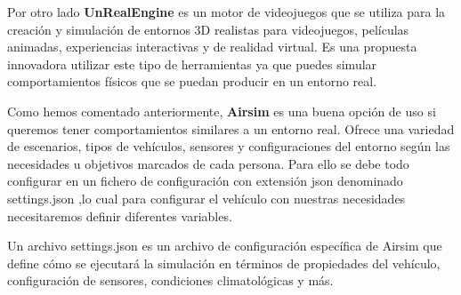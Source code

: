 Por otro lado \textbf{UnRealEngine} es un motor de videojuegos que se utiliza para la creación y simulación de entornos 3D realistas para videojuegos,
películas animadas, experiencias interactivas y de realidad virtual. Es una propuesta innovadora utilizar este tipo de herramientas ya que puedes simular 
comportamientos físicos que se puedan producir en un entorno real. \newline

Como hemos comentado anteriormente, \textbf{Airsim} es una buena opción de uso si queremos tener comportamientos
similares a un entorno real. Ofrece una variedad de escenarios, tipos de vehículos, sensores y configuraciones del entorno 
según las necesidades u objetivos marcados de cada persona. 
Para ello se debe todo configurar en un fichero de configuración con extensión json denominado settings.json ,lo cual para configurar
el vehículo con nuestras necesidades necesitaremos definir diferentes variables. \newline

Un archivo settings.json es un archivo de configuración específica de Airsim que define cómo 
se ejecutará la simulación en términos de propiedades del vehículo, configuración de sensores, condiciones climatológicas y más. \newline

